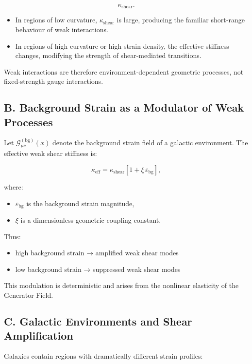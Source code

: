 \documentclass[reprint,amsmath,amssymb,aps,prl,floatfix]{revtex4-2}
\begin{document}
\[
\kappa_{\mathrm{shear}}.
\]
\begin{itemize}
\item In regions of low curvature, \(\kappa_{\mathrm{shear}}\) is large, producing the familiar short‑range behaviour of weak interactions.  
\item In regions of high curvature or high strain density, the effective stiffness changes, modifying the strength of shear‑mediated transitions.
\end{itemize}

Weak interactions are therefore environment‑dependent geometric processes, not fixed‑strength gauge interactions.

\subsection{B. Background Strain as a Modulator of Weak Processes}

Let \(\mathcal{G}_{\mu\nu}^{(\mathrm{bg})}(x)\) denote the background strain field of a galactic environment.  
The effective weak shear stiffness is:

\[
\kappa_{\mathrm{eff}}
=
\kappa_{\mathrm{shear}}
\left[
1 + \xi\,\varepsilon_{\mathrm{bg}}
\right],
\]

where:
\begin{itemize}
\item \(\varepsilon_{\mathrm{bg}}\) is the background strain magnitude,  
\item \(\xi\) is a dimensionless geometric coupling constant.
\end{itemize}

Thus:
\begin{itemize}
\item high background strain → amplified weak shear modes  
\item low background strain → suppressed weak shear modes
\end{itemize}

This modulation is deterministic and arises from the nonlinear elasticity of the Generator Field.

\subsection{C. Galactic Environments and Shear Amplification}

Galaxies contain regions with dramatically different strain profiles:
\end{document}
